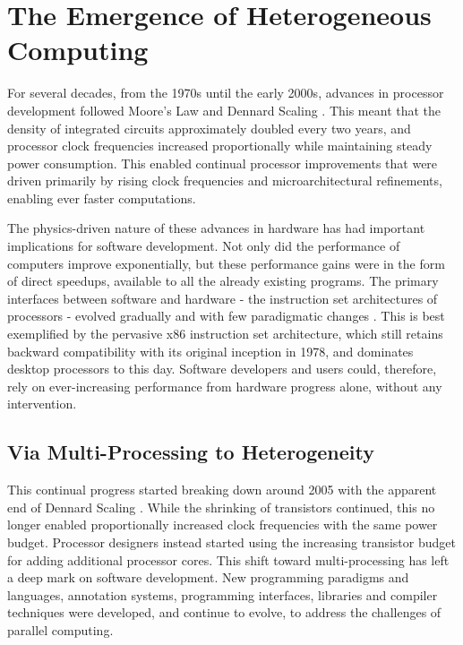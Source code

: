 \section{The Emergence of Heterogeneous Computing}

    For several decades, from the 1970s until the early 2000s, advances in
    processor development followed Moore's Law \citep{4785860} and
    Dennard Scaling \citep{1050511}.
    This meant that the density of integrated circuits approximately doubled
    every two years, and processor clock frequencies increased proportionally
    while maintaining steady power consumption.
    This enabled continual processor improvements that were driven primarily by
    rising clock frequencies and microarchitectural refinements, enabling ever
    faster computations.

    The physics-driven nature \citep{Hutcheson2018Moore} of these advances in
    hardware has had important implications for software development.
    Not only did the performance of computers improve exponentially, but these
    performance gains were in the form of direct speedups, available to all the
    already existing programs.
    The primary interfaces between software and hardware - the instruction set
    architectures of processors - evolved gradually and with few
    paradigmatic changes \citep{8310168}.
    This is best exemplified by the pervasive x86 instruction set architecture,
    which still retains backward compatibility with its original inception in
    1978, and dominates desktop processors to this day.
    Software developers and users could, therefore, rely on ever-increasing
    performance from hardware progress alone, without any intervention.

\subsection{Via Multi-Processing to Heterogeneity}

    This continual progress started breaking down around 2005 with the apparent
    end of Dennard Scaling \citep{6307773}.
    While the shrinking of transistors continued, this no longer enabled
    proportionally increased clock frequencies with the same power budget.
    Processor designers instead started using the increasing transistor
    budget for adding additional processor cores.
    This shift toward multi-processing has left a deep mark on software
    development.
    New programming paradigms and languages, annotation systems, programming
    interfaces, libraries and compiler techniques were developed, and continue
    to evolve, to address the challenges of parallel computing.

